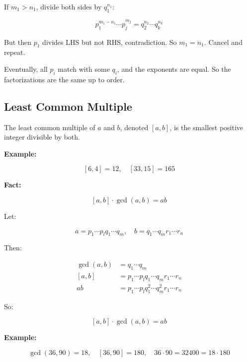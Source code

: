 If \(m_1 > n_1\), divide both sides by \(q_1^{n_1}\):

\[
	p_1^{m_1-n_1} \cdots p_j^{m_j} = q_2^{n_2} \cdots q_k^{n_k}
\]

But then \(p_1\) divides LHS but not RHS, contradiction. So \(m_1 = n_1\). Cancel and repeat.
\vspace{\baselineskip}

Eventually, all \(p_i\) match with some \(q_i\), and the exponents are equal. So the factorizations 
are the same up to order.

\QED

\subsection{Least Common Multiple}

The least common multiple of \(a\) and \(b\), denoted \([a, b]\), is the smallest positive integer 
divisible by both.
\vspace{\baselineskip}

\textbf{Example:}
\vspace{\baselineskip}

\[
	[6, 4] = 12, \quad [33, 15] = 165
\]

\textbf{Fact:}

\[
	[a, b] \cdot \gcd(a, b) = ab
\]

Let:

\[
	a = p_1 \cdots p_lq_1 \cdots q_m, \quad b = q_1 \cdots q_mr_1 \cdots r_n
\]

Then:

\begin{align*}
	\gcd(a, b) & = q_1 \cdots q_m                                 \\
	[a, b]     & = p_1 \cdots p_lq_1 \cdots q_mr_1 \cdots r_n     \\
	ab         & = p_1 \cdots p_lq_1^2 \cdots q_m^2r_1 \cdots r_n
\end{align*}

So:

\[
	[a, b] \cdot \gcd(a, b) = ab
\]

\textbf{Example:}

\[
	\gcd(36, 90) = 18, \quad [36, 90] = 180, \quad 36 \cdot 90 = 32400 = 18 \cdot 180
\]
